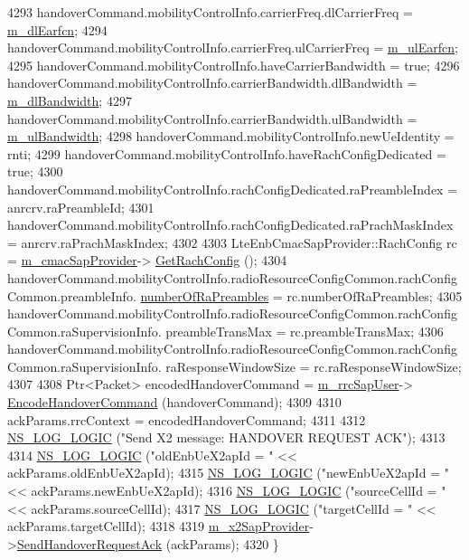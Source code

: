 \begin{DoxyCode}
4293   handoverCommand.mobilityControlInfo.carrierFreq.dlCarrierFreq = \hyperlink{classns3_1_1LteEnbRrc_aee99fe7a94ae8ef45983f580e36be04a}{m\_dlEarfcn};
4294   handoverCommand.mobilityControlInfo.carrierFreq.ulCarrierFreq = \hyperlink{classns3_1_1LteEnbRrc_a34f34f9748426411f1027d0550dbe2c0}{m\_ulEarfcn};
4295   handoverCommand.mobilityControlInfo.haveCarrierBandwidth = \textcolor{keyword}{true};
4296   handoverCommand.mobilityControlInfo.carrierBandwidth.dlBandwidth = 
      \hyperlink{classns3_1_1LteEnbRrc_afb2dd8321c2d4733572c9240f7bc9751}{m\_dlBandwidth};
4297   handoverCommand.mobilityControlInfo.carrierBandwidth.ulBandwidth = 
      \hyperlink{classns3_1_1LteEnbRrc_a72fae86a1a284d181d9b977bf0201ed0}{m\_ulBandwidth};
4298   handoverCommand.mobilityControlInfo.newUeIdentity = rnti;
4299   handoverCommand.mobilityControlInfo.haveRachConfigDedicated = \textcolor{keyword}{true};
4300   handoverCommand.mobilityControlInfo.rachConfigDedicated.raPreambleIndex = anrcrv.raPreambleId;
4301   handoverCommand.mobilityControlInfo.rachConfigDedicated.raPrachMaskIndex = anrcrv.raPrachMaskIndex;
4302 
4303   LteEnbCmacSapProvider::RachConfig rc = \hyperlink{classns3_1_1LteEnbRrc_ae5bd011924ef4e221d19d705d6663e8b}{m\_cmacSapProvider}->
      \hyperlink{classns3_1_1LteEnbCmacSapProvider_a12632261a38a19676a1853bba76cea24}{GetRachConfig} ();
4304   handoverCommand.mobilityControlInfo.radioResourceConfigCommon.rachConfigCommon.preambleInfo.
      \hyperlink{structns3_1_1LteEnbCmacSapProvider_1_1RachConfig_aaf2f9cefb4961854d40da9b4321d5c8d}{numberOfRaPreambles} = rc.numberOfRaPreambles;
4305   handoverCommand.mobilityControlInfo.radioResourceConfigCommon.rachConfigCommon.raSupervisionInfo.
      preambleTransMax = rc.preambleTransMax;
4306   handoverCommand.mobilityControlInfo.radioResourceConfigCommon.rachConfigCommon.raSupervisionInfo.
      raResponseWindowSize = rc.raResponseWindowSize;
4307 
4308   Ptr<Packet> encodedHandoverCommand = \hyperlink{classns3_1_1LteEnbRrc_a7bbf35518d70915fcd24d68a835fe6af}{m\_rrcSapUser}->
      \hyperlink{classns3_1_1LteEnbRrcSapUser_a3df7c56ab7b01b04c5745a117a9bc13a}{EncodeHandoverCommand} (handoverCommand);
4309 
4310   ackParams.rrcContext = encodedHandoverCommand;
4311 
4312   \hyperlink{group__logging_ga88acd260151caf2db9c0fc84997f45ce}{NS\_LOG\_LOGIC} (\textcolor{stringliteral}{"Send X2 message: HANDOVER REQUEST ACK"});
4313 
4314   \hyperlink{group__logging_ga88acd260151caf2db9c0fc84997f45ce}{NS\_LOG\_LOGIC} (\textcolor{stringliteral}{"oldEnbUeX2apId = "} << ackParams.oldEnbUeX2apId);
4315   \hyperlink{group__logging_ga88acd260151caf2db9c0fc84997f45ce}{NS\_LOG\_LOGIC} (\textcolor{stringliteral}{"newEnbUeX2apId = "} << ackParams.newEnbUeX2apId);
4316   \hyperlink{group__logging_ga88acd260151caf2db9c0fc84997f45ce}{NS\_LOG\_LOGIC} (\textcolor{stringliteral}{"sourceCellId = "} << ackParams.sourceCellId);
4317   \hyperlink{group__logging_ga88acd260151caf2db9c0fc84997f45ce}{NS\_LOG\_LOGIC} (\textcolor{stringliteral}{"targetCellId = "} << ackParams.targetCellId);
4318 
4319   \hyperlink{classns3_1_1LteEnbRrc_ae8dc75f4f6f63b7736d86204a4beb415}{m\_x2SapProvider}->\hyperlink{classns3_1_1EpcX2SapProvider_a1675338e78f6d98636db777a3b771f60}{SendHandoverRequestAck} (ackParams);
4320 \}
\end{DoxyCode}


